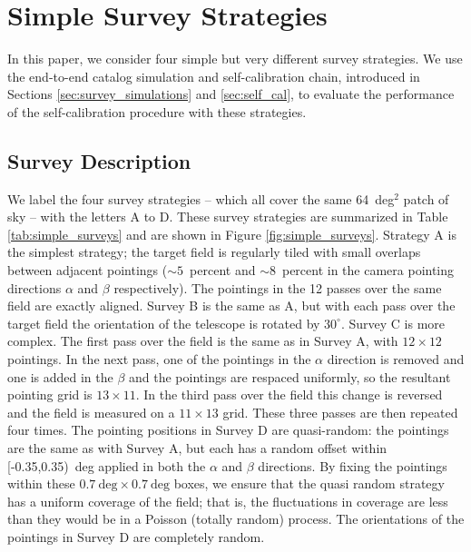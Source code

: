 \documentclass[preprint,pdftex]{aastex}
\begin{document}
\section{Simple Survey Strategies}
\label{sec:simple_surveys}
In this paper, we consider four simple but very different survey strategies. We use the end-to-end catalog simulation and self-calibration chain, introduced in Sections \ref{sec:survey_simulations} and \ref{sec:self_cal}, to evaluate the performance of the self-calibration procedure with these strategies. 

\subsection{Survey Description}
We label the four survey strategies -- which all cover the same 64~deg$^2$ patch of sky -- with the letters A to D. These survey strategies are summarized in Table \ref{tab:simple_surveys} and are shown in Figure \ref{fig:simple_surveys}. Strategy A is the simplest strategy; the target field is regularly tiled with small overlaps between adjacent pointings ($\sim 5$~percent and $\sim 8$~percent in the camera pointing directions $\alpha$ and $\beta$ respectively). The pointings in the 12 passes over the same field are exactly aligned. Survey B is the same as A, but with each pass over the target field the orientation of the telescope is rotated by $30^\circ$. Survey C is more complex. The first pass over the field is the same as in Survey A, with $12 \times 12$ pointings. In the next pass, one of the pointings in the $\alpha$ direction is removed and one is added in the $\beta$ and the pointings are respaced uniformly, so the resultant pointing grid is $13 \times 11$. In the third pass over the field this change is reversed and the field is measured on a $11 \times 13$ grid. These three passes are then repeated four times. The pointing positions in Survey D are quasi-random: the pointings are the same as with Survey A, but each has a random offset within [-0.35,0.35)~deg applied in both the $\alpha$ and $\beta$ directions. By fixing the pointings within these $0.7~\text{deg} \times 0.7~\text{deg}$ boxes, we ensure that the quasi random strategy has a uniform coverage of the field; that is, the fluctuations in coverage are less than they would be in a Poisson (totally random) process. The orientations of the pointings in Survey D are completely random.
\end{document}
